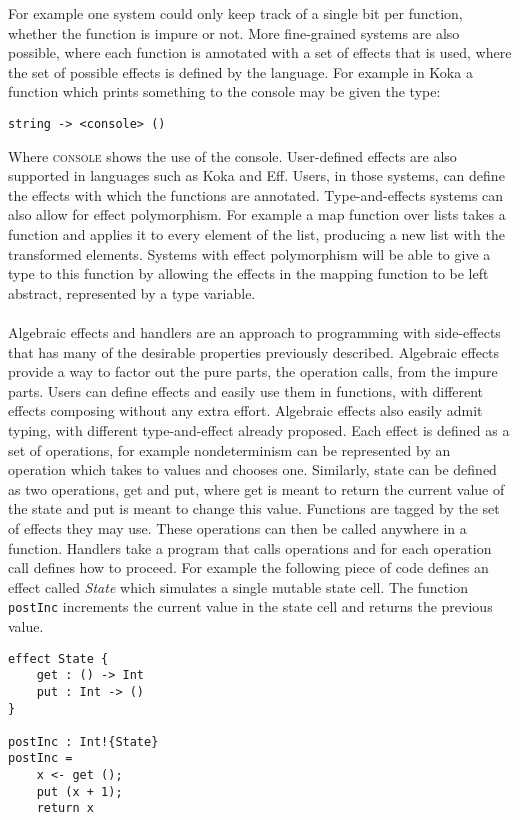 For example one system could only keep track of a single bit per function, whether the function is impure or not.
More fine-grained systems are also possible, where each function is annotated with a set of effects that is used, where the set of possible effects is defined by the language.
For example in Koka a function which prints something to the console may be given the type:
\begin{verbatim}
string -> <console> () 
\end{verbatim}
Where \textsc{console} shows the use of the console.
User-defined effects are also supported in languages such as Koka and Eff.
Users, in those systems, can define the effects with which the functions are annotated.
Type-and-effects systems can also allow for effect polymorphism.
For example a map function over lists takes a function and applies it to every element of the list, producing a new list with the transformed elements.
Systems with effect polymorphism will be able to give a type to this function by allowing the effects in the mapping function to be left abstract, represented by a type variable.
\\\\
Algebraic effects and handlers\cite{algeff} are an approach to programming with side-effects that has many of the desirable properties previously described.
Algebraic effects provide a way to factor out the pure parts, the operation calls, from the impure parts.
Users can define effects and easily use them in functions, with different effects composing without any extra effort.
Algebraic effects also easily admit typing, with different type-and-effect already proposed\cite{eff2}\cite{koka}\cite{links}.
Each effect is defined as a set of operations, for example nondeterminism can be represented by an operation which takes to values and chooses one.
Similarly, state can be defined as two operations, get and put, where get is meant to return the current value of the state and put is meant to change this value.
Functions are tagged by the set of effects they may use.
These operations can then be called anywhere in a function.
Handlers take a program that calls operations and for each operation call defines how to proceed.
For example the following piece of code defines an effect called \textit{State} which simulates a single mutable state cell.
The function \texttt{postInc} increments the current value in the state cell and returns the previous value.
\begin{verbatim}
effect State {
	get : () -> Int
	put : Int -> ()
}

postInc : Int!{State}
postInc =
	x <- get ();
	put (x + 1);
	return x
\end{verbatim}

